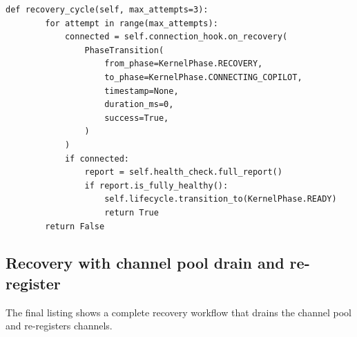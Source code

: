 \documentclass[11pt]{article}
\begin{document}
\begin{lstlisting}[style=jugeo-python,
  caption={Lifecycle-integrated health monitoring},
  label={lst:lifecyclehealth}]
    def recovery_cycle(self, max_attempts=3):
        for attempt in range(max_attempts):
            connected = self.connection_hook.on_recovery(
                PhaseTransition(
                    from_phase=KernelPhase.RECOVERY,
                    to_phase=KernelPhase.CONNECTING_COPILOT,
                    timestamp=None,
                    duration_ms=0,
                    success=True,
                )
            )
            if connected:
                report = self.health_check.full_report()
                if report.is_fully_healthy():
                    self.lifecycle.transition_to(KernelPhase.READY)
                    return True
        return False
\end{lstlisting}

\subsection{Recovery with channel pool drain and re-register}

The final listing shows a complete recovery workflow
that drains the channel pool and re-registers channels.
\end{document}
